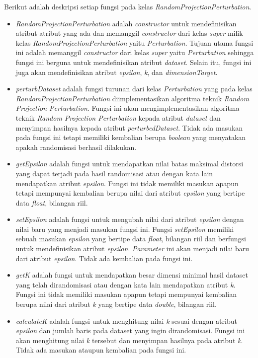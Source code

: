 Berikut adalah deskripsi setiap fungsi pada kelas \textit{RandomProjectionPerturbation}.
\begin{itemize}
	\item \textit{RandomProjectionPerturbation} adalah \textit{constructor} untuk mendefinisikan atribut-atribut yang ada dan memanggil \textit{constructor} dari kelas \textit{super} milik kelas \textit{RandomProjectionPerturbation} yaitu \textit{Perturbation}. Tujuan utama fungsi ini adalah memanggil \textit{constructor} dari kelas \textit{super} yaitu \textit{Perturbation} sehingga fungsi ini berguna untuk mendefinisikan atribut \textit{dataset}. Selain itu, fungsi ini juga akan mendefinisikan atribut \textit{epsilon}, \textit{k}, dan \textit{dimensionTarget}.
	\item \textit{perturbDataset} adalah fungsi turunan dari kelas \textit{Perturbation} yang pada kelas \textit{RandomProjectionPerturbation} diimplementasikan algoritma teknik \textit{Random Projection Perturbation}. Fungsi ini akan mengimplementasikan algoritma teknik \textit{Random Projection Perturbation} kepada atribut \textit{dataset} dan menyimpan hasilnya kepada atribut \textit{perturbedDataset}. Tidak ada masukan pada fungsi ini tetapi memiliki kembalian berupa \textit{boolean} yang menyatakan apakah randomisasi berhasil dilakukan.
	\item \textit{getEpsilon} adalah fungsi untuk mendapatkan nilai batas maksimal distorsi yang dapat terjadi pada hasil randomisasi atau dengan kata lain mendapatkan atribut \textit{epsilon}. Fungsi ini tidak memiliki masukan apapun tetapi mempunyai kembalian berupa nilai dari atribut \textit{epsilon} yang bertipe data \textit{float}, bilangan riil.
	\item \textit{setEpsilon} adalah fungsi untuk mengubah nilai dari atribut \textit{epsilon} dengan nilai baru yang menjadi masukan fungsi ini. Fungsi \textit{setEpsilon} memiliki sebuah masukan \textit{epsilon} yang bertipe data \textit{float}, bilangan riil dan berfungsi untuk mendefinisikan atribut \textit{epsilon}. \textit{Parameter} ini akan menjadi nilai baru dari atribut \textit{epsilon}. Tidak ada kembalian pada fungsi ini.
	\item \textit{getK} adalah fungsi untuk mendapatkan besar dimensi minimal hasil dataset yang telah dirandomisasi atau dengan kata lain mendapatkan atribut \textit{k}. Fungsi ini tidak memiliki masukan apapun tetapi mempunyai kembalian berupa nilai dari atribut \textit{k} yang bertipe data \textit{double}, bilangan riil.
	\item \textit{calculateK} adalah fungsi untuk menghitung nilai \textit{k} sesuai dengan atribut \textit{epsilon} dan jumlah baris pada dataset yang ingin dirandomisasi. Fungsi ini akan menghitung nilai \textit{k} tersebut dan menyimpan hasilnya pada atribut \textit{k}. Tidak ada masukan ataupun kembalian pada fungsi ini.

\end{itemize}
